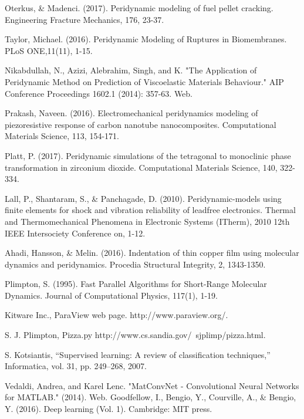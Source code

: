 \begin{thebibliography}{}
Oterkus, \& Madenci. (2017). Peridynamic modeling of fuel pellet cracking. Engineering Fracture Mechanics, 176, 23-37.

Taylor, Michael. (2016). Peridynamic Modeling of Ruptures in Biomembranes. PLoS ONE,11(11), 1-15.

Nikabdullah, N., Azizi, Alebrahim, Singh, and K. "The Application of Peridynamic Method on Prediction of Viscoelastic Materials Behaviour." AIP Conference Proceedings 1602.1 (2014): 357-63. Web.

Prakash, Naveen. (2016). Electromechanical peridynamics modeling of piezoresistive response of carbon nanotube nanocomposites. Computational Materials Science, 113, 154-171.

Platt, P. (2017). Peridynamic simulations of the tetragonal to monoclinic phase transformation in zirconium dioxide. Computational Materials Science, 140, 322-334.

Lall, P., Shantaram, S., \& Panchagade, D. (2010). Peridynamic-models using finite elements for shock and vibration reliability of leadfree electronics. Thermal and Thermomechanical Phenomena in Electronic Systems (ITherm), 2010 12th IEEE Intersociety Conference on, 1-12.

Ahadi, Hansson, \& Melin. (2016). Indentation of thin copper film using molecular dynamics and peridynamics. Procedia Structural Integrity, 2, 1343-1350.

Plimpton, S. (1995). Fast Parallel Algorithms for Short-Range Molecular Dynamics. Journal of Computational Physics, 117(1), 1-19.

Kitware Inc., ParaView web page. http://www.paraview.org/.

S. J. Plimpton, Pizza.py http://www.cs.sandia.gov/~sjplimp/pizza.html.

S. Kotsiantis, “Supervised learning: A review of classification techniques,” Informatica, vol. 31, pp. 249–268, 2007.

Vedaldi, Andrea, and Karel Lenc. "MatConvNet - Convolutional Neural Networks for MATLAB." (2014). Web.
Goodfellow, I., Bengio, Y., Courville, A., \& Bengio, Y. (2016). Deep learning (Vol. 1). Cambridge: MIT press.


\end{thebibliography}
